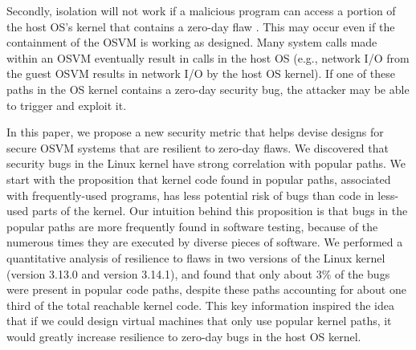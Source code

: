Secondly, isolation will not work if a malicious
program can access a portion of the host OS's kernel that contains a
zero-day flaw \cite{CVE-2016-5195}. This may occur even if the containment of the OSVM is
working as designed. 
Many system calls made within an OSVM eventually
result in calls in the host OS (e.g., network I/O from the guest
OSVM results in network I/O by the host OS kernel). If one of these paths in
the OS kernel contains a zero-day security bug, the attacker
may be able to trigger and exploit it.



In this paper, we propose a new security metric that helps devise designs for secure OSVM systems that are
resilient to zero-day flaws. 
We discovered that security bugs in the Linux kernel have strong correlation with popular paths. 
We start with the proposition that kernel code found in popular paths, associated with frequently-used programs,
has less potential risk of bugs than code in less-used parts of the kernel.
Our intuition behind this proposition is that bugs in the popular paths are
more frequently found in software testing, because of the numerous times they are executed by
diverse pieces of software.
We performed a quantitative analysis of resilience
to flaws in two versions of the Linux kernel (version 3.13.0 and version 3.14.1), and
found that only about 3\% of the bugs were present in popular code paths,
despite these paths accounting for about one third of the total reachable
kernel code. 
This key information inspired the idea that 
if we could design virtual machines that only use popular kernel paths, 
it would greatly increase resilience to zero-day bugs in the host OS kernel. 

